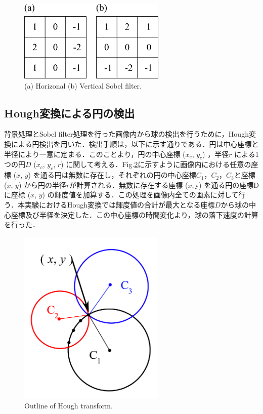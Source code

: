 \begin{figure}[h]
    \centering
    \includegraphics[width=7.0cm,clip]{3-Analysis/sobel-filter.png}
    \caption{(a) Horizonal (b) Vertical Sobel filter.}
    \label{fig:sobel}
\end{figure}

\newpage

\subsection{Hough変換による円の検出}
背景処理とSobel filter処理を行った画像内から球の検出を行うために，Hough変換による円検出を用いた．検出手順は，以下に示す通りである．円は中心座標と半径により一意に定まる．このことより，円の中心座標 ($x_c$, $y_c$) ，半径$r$ による1つの円$D$ ($x_c$, $y_c$, $r$) に関して考える．Fig.\ref{fig:hough}に示すように画像内における任意の座標 ($x$, $y$) を通る円は無数に存在し，それぞれの円の中心座標$C_1$，$C_2$，$C_3$と座標 ($x$, $y$) から円の半径$r$が計算される．無数に存在する座標 ($x, $y) を通る円の座標Dに座標 ($x$, $y$) の輝度値を加算する．この処理を画像内全ての画素に対して行う．本実験におけるHough変換では輝度値の合計が最大となる座標$D$から球の中心座標及び半径を決定した．この中心座標の時間変化より，球の落下速度の計算を行った．

\begin{figure}[h]
    \centering
    \includegraphics[width=7.0cm,clip]{3-Analysis/hough.PNG}
    \caption{Outline of Hough transform.}
    \label{fig:hough}
\end{figure}
